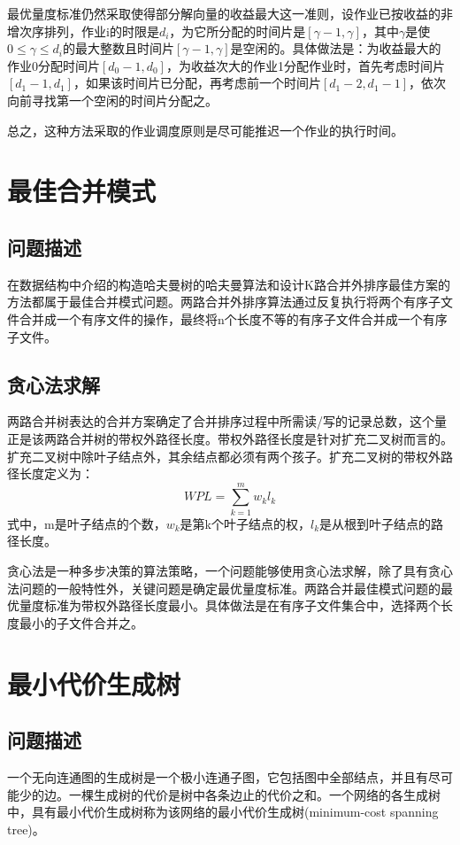 最优量度标准仍然采取使得部分解向量的收益最大这一准则，设作业已按收益的非增次序排列，作业i的时限是$d_i$，为它所分配的时间片是$[\gamma -1,\gamma]$，其中$\gamma$是使$0\leq \gamma\leq d_i$的最大整数且时间片$[\gamma-1,\gamma]$是空闲的。具体做法是：为收益最大的作业0分配时间片$[d_0-1,d_0]$，为收益次大的作业1分配作业时，首先考虑时间片$[d_1-1,d_1]$，如果该时间片已分配，再考虑前一个时间片$[d_1-2,d_1-1]$，依次向前寻找第一个空闲的时间片分配之。

总之，这种方法采取的作业调度原则是尽可能推迟一个作业的执行时间。
\section{最佳合并模式}
\subsection*{问题描述}
在数据结构中介绍的构造哈夫曼树的哈夫曼算法和设计K路合并外排序最佳方案的方法都属于最佳合并模式问题。两路合并外排序算法通过反复执行将两个有序子文件合并成一个有序文件的操作，最终将n个长度不等的有序子文件合并成一个有序子文件。
\subsection*{贪心法求解}
两路合并树表达的合并方案确定了合并排序过程中所需读/写的记录总数，这个量正是该两路合并树的带权外路径长度。带权外路径长度是针对扩充二叉树而言的。扩充二叉树中除叶子结点外，其余结点都必须有两个孩子。扩充二叉树的带权外路径长度定义为：
\begin{equation}
	WPL=\sum_{k=1}^{m}w_{k}l_k
\end{equation}
式中，m是叶子结点的个数，$w_k$是第k个叶子结点的权，$l_k$是从根到叶子结点的路径长度。

贪心法是一种多步决策的算法策略，一个问题能够使用贪心法求解，除了具有贪心法问题的一般特性外，关键问题是确定最优量度标准。两路合并最佳模式问题的最优量度标准为带权外路径长度最小。具体做法是在有序子文件集合中，选择两个长度最小的子文件合并之。


\section{最小代价生成树}
\subsection*{问题描述}
一个无向连通图的生成树是一个极小连通子图，它包括图中全部结点，并且有尽可能少的边。一棵生成树的代价是树中各条边止的代价之和。一个网络的各生成树中，具有最小代价生成树称为该网络的最小代价生成树(minimum-cost spanning tree)。
